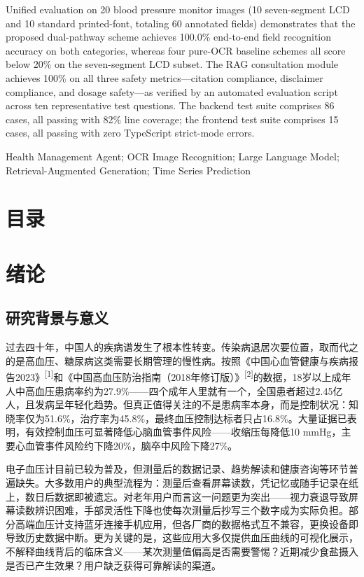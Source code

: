 \documentclass[zihao=-4,a4paper]{ctexart}
\begin{document}
{Unified evaluation on 20 blood pressure monitor images (10 seven-segment LCD and 10 standard printed-font, totaling 60 annotated fields) demonstrates that the proposed dual-pathway scheme achieves 100.0\% end-to-end field recognition accuracy on both categories, whereas four pure-OCR baseline schemes all score below 20\% on the seven-segment LCD subset. The RAG consultation module achieves 100\% on all three safety metrics—citation compliance, disclaimer compliance, and dosage safety—as verified by an automated evaluation script across ten representative test questions. The backend test suite comprises 86 cases, all passing with 82\% line coverage; the frontend test suite comprises 15 cases, all passing with zero TypeScript strict-mode errors.
}

\vspace{1cm}
 Health Management Agent; OCR Image Recognition; Large Language Model; Retrieval-Augmented Generation; Time Series Prediction

\newpage
\section*{目\hspace{2em}录}
\tableofcontents
\newpage

\section{绪论}

\subsection{研究背景与意义}

过去四十年，中国人的疾病谱发生了根本性转变。传染病退居次要位置，取而代之的是高血压、糖尿病这类需要长期管理的慢性病。按照《中国心血管健康与疾病报告2023》\textsuperscript{[1]}和《中国高血压防治指南（2018年修订版）》\textsuperscript{[2]}的数据，18岁以上成年人中高血压患病率约为27.9\%——四个成年人里就有一个，全国患者超过2.45亿人，且发病呈年轻化趋势。但真正值得关注的不是患病率本身，而是控制状况：知晓率仅为51.6\%，治疗率为45.8\%，最终血压控制达标者只占16.8\%。大量证据已表明，有效控制血压可显著降低心脑血管事件风险——收缩压每降低10 mmHg，主要心血管事件风险约下降20\%，脑卒中风险下降27\%。

电子血压计目前已较为普及，但测量后的数据记录、趋势解读和健康咨询等环节普遍缺失。大多数用户的典型流程为：测量后查看屏幕读数，凭记忆或随手记录在纸上，数日后数据即被遗忘。对老年用户而言这一问题更为突出——视力衰退导致屏幕读数辨识困难，手部灵活性下降也使每次测量后抄写三个数字成为实际负担。部分高端血压计支持蓝牙连接手机应用，但各厂商的数据格式互不兼容，更换设备即导致历史数据中断。更为关键的是，这些应用大多仅提供血压曲线的可视化展示，不解释曲线背后的临床含义——某次测量值偏高是否需要警惕？近期减少食盐摄入是否已产生效果？用户缺乏获得可靠解读的渠道。
\end{document}
